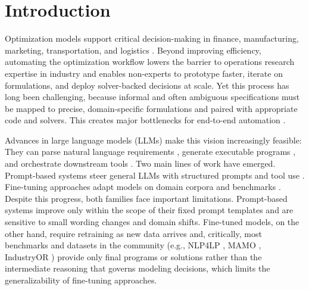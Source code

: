 \documentclass[sigconf, nonacm]{acmart}
\begin{document}

\maketitle

\section{Introduction}

Optimization models support critical decision-making in finance, manufacturing, marketing, transportation, and logistics \citep{ahmaditeshnizi2024optimus,bertsimas1997introduction,NL4OPT}. Beyond improving efficiency, automating the optimization workflow lowers the barrier to operations research expertise in industry and enables non-experts to prototype faster, iterate on formulations, and deploy solver-backed decisions at scale. Yet this process has long been challenging, because informal and often ambiguous specifications must be mapped to precise, domain-specific formulations and paired with appropriate code and solvers. This creates major bottlenecks for end-to-end automation \citep{JiangShu2025llmopt}.

Advances in large language models (LLMs) make this vision increasingly feasible: They can parse natural language requirements \citep{ouyang2022training}, generate executable programs \citep{nijkampcodegen,jimenez2024swebench}, and orchestrate downstream tools \citep{DBLP:conf/iclr/QinLYZYLLCTQZHT24}. Two main lines of work have emerged. Prompt-based systems steer general LLMs with structured prompts and tool use \citep{xiao2023chain, thind2025optimai, ahmaditeshnizi2024optimus, zhang2025or}. Fine-tuning approaches adapt models on domain corpora and benchmarks \citep{huang2025orlm, yang2024optibench}. Despite this progress, both families face important limitations. Prompt-based systems improve only within the scope of their fixed prompt templates and are sensitive to small wording changes and domain shifts. Fine-tuned models, on the other hand, require retraining as new data arrives and, critically, most benchmarks and datasets in the community (e.g., NLP4LP \citep{ahmaditeshnizi2024optimus}, MAMO \citep{huang2024mamo}, IndustryOR \citep{huang2025orlm}) provide only final programs or solutions rather than the intermediate reasoning that governs modeling decisions, which limits the generalizability of fine-tuning approaches.
\end{document}
